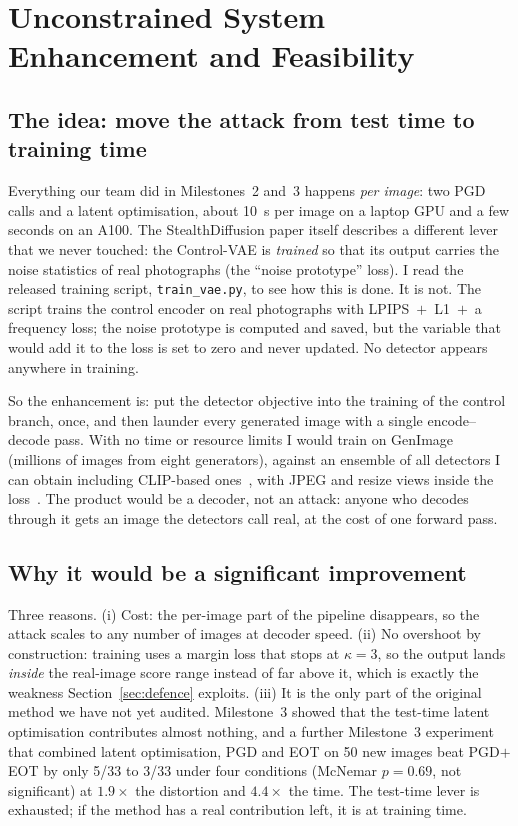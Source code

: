 \documentclass[journal]{IEEEtran}
\begin{document}
\section{Unconstrained System Enhancement and Feasibility}
\label{sec:enhance}

\subsection{The idea: move the attack from test time to training time}
\label{sec:enhance-idea}

Everything our team did in Milestones~2 and~3 happens \emph{per image}: two PGD calls and a latent optimisation, about 10~s per image on a laptop GPU and a few seconds on an A100. The StealthDiffusion paper itself describes a different lever that we never touched: the Control-VAE is \emph{trained} so that its output carries the noise statistics of real photographs (the ``noise prototype'' loss). I read the released training script, \texttt{train\_vae.py}, to see how this is done. It is not. The script trains the control encoder on real photographs with LPIPS~$+$~L1~$+$~a frequency loss; the noise prototype is computed and saved, but the variable that would add it to the loss is set to zero and never updated. No detector appears anywhere in training.

So the enhancement is: put the detector objective into the training of the control branch, once, and then launder every generated image with a single encode--decode pass. With no time or resource limits I would train on GenImage~\cite{zhu2023genimage} (millions of images from eight generators), against an ensemble of all detectors I can obtain including CLIP-based ones~\cite{ojha2023univfd}, with JPEG and resize views inside the loss~\cite{athalye2018eot}. The product would be a decoder, not an attack: anyone who decodes through it gets an image the detectors call real, at the cost of one forward pass.

\subsection{Why it would be a significant improvement}
Three reasons. (i) Cost: the per-image part of the pipeline disappears, so the attack scales to any number of images at decoder speed. (ii) No overshoot by construction: training uses a margin loss that stops at $\kappa=3$, so the output lands \emph{inside} the real-image score range instead of far above it, which is exactly the weakness Section~\ref{sec:defence} exploits. (iii) It is the only part of the original method we have not yet audited. Milestone~3 showed that the test-time latent optimisation contributes almost nothing, and a further Milestone~3 experiment that combined latent optimisation, PGD and EOT on 50 new images beat PGD$+$EOT by only 5/33 to 3/33 under four conditions (McNemar $p=0.69$, not significant) at $1.9\times$ the distortion and $4.4\times$ the time. The test-time lever is exhausted; if the method has a real contribution left, it is at training time.
\end{document}
